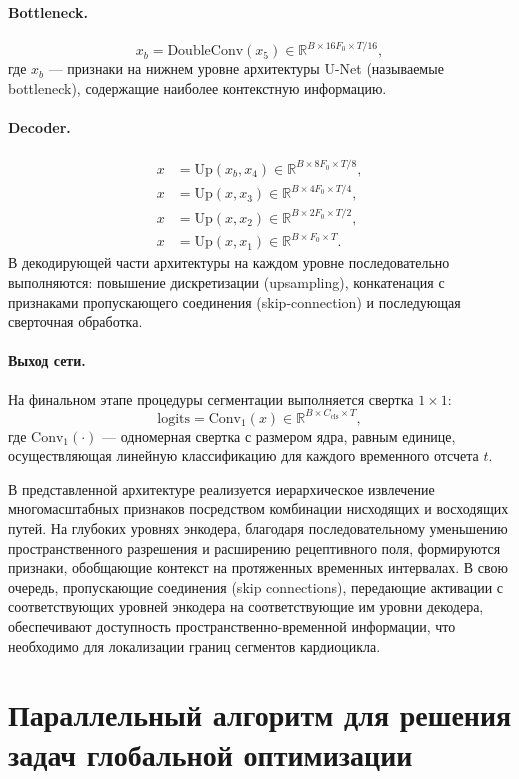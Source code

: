 \documentclass[10pt,a4paper]{book}
\begin{document}
\paragraph{Bottleneck.}
\[
x_b = \text{DoubleConv}(x_5) \in \mathbb{R}^{B \times 16F_0 \times T/16},
\]
где $x_b$ --- признаки на нижнем уровне архитектуры U-Net (называемые bottleneck), содержащие наиболее контекстную информацию.

\paragraph{Decoder.}
\begin{align*}
x &= \text{Up}(x_b, x_4) \in \mathbb{R}^{B \times 8F_0 \times T/8},\\
x &= \text{Up}(x, x_3) \in \mathbb{R}^{B \times 4F_0 \times T/4},\\
x &= \text{Up}(x, x_2) \in \mathbb{R}^{B \times 2F_0 \times T/2},\\
x &= \text{Up}(x, x_1) \in \mathbb{R}^{B \times F_0 \times T}.
\end{align*}
В декодирующей части архитектуры на каждом уровне последовательно выполняются: повышение дискретизации (upsampling), конкатенация с признаками пропускающего соединения (skip-connection) и последующая сверточная обработка.

\paragraph{Выход сети.}
На финальном этапе процедуры сегментации выполняется свертка $1\times1$:
\[
\text{logits} = \text{Conv}_{1}(x) \in \mathbb{R}^{B \times C_{\text{cls}} \times T},
\]
где $\text{Conv}_{1}(\cdot)$ --- одномерная свертка с размером ядра, равным единице, осуществляющая линейную классификацию для каждого временного отсчета $t$.

В представленной архитектуре реализуется иерархическое извлечение многомасштабных признаков посредством комбинации нисходящих и восходящих путей. На глубоких уровнях энкодера, благодаря последовательному уменьшению пространственного разрешения и расширению рецептивного поля, формируются признаки, обобщающие контекст на протяженных временных интервалах. В свою очередь, пропускающие соединения (skip connections), передающие активации с соответствующих уровней энкодера на соответствующие им уровни декодера, обеспечивают доступность пространственно-временной информации, что необходимо для локализации границ сегментов кардиоцикла.

\section{Параллельный алгоритм для решения задач глобальной оптимизации}
\label{sec-PGSA}
\end{document}
